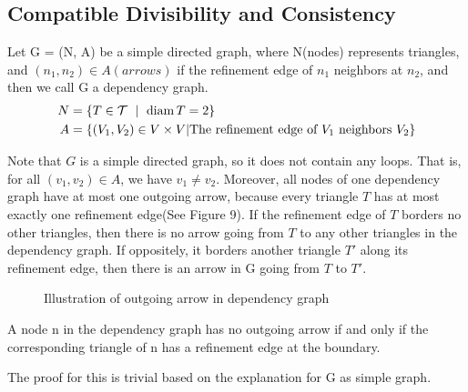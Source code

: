     \subsection{Compatible Divisibility and Consistency}
    \begin{definition*}
      Let G = (N, A) be a simple directed graph, where N(nodes) represents triangles, and $(n_1, n_2)\in A (arrows)$ if the refinement edge of $n_1$ neighbors at $n_2$, and then we call G a dependency graph.
      \begin{align*}
      N &= \{T\in\mathcal{T}~\mid~\operatorname{diam}{T} = 2\}\\
      A &= \{(V_1, V_2)\in V\times V | \text{The refinement edge of $V_1$ neighbors $V_2$}\}
      \end{align*}
    \end{definition*}
    Note that $G$ is a simple directed graph, so it does not contain any loops. That is, for all $(v_1, v_2)\in A$, we have $v_1\neq v_2$. Moreover, all nodes of one dependency graph have at most one outgoing arrow, because every triangle $T$ has at most exactly one refinement edge(See Figure 9). If the refinement edge of $T$ borders no other triangles, then there is no arrow going from $T$ to any other triangles in the dependency graph. If oppositely, it borders another triangle $T'$ along its refinement edge, then there is an arrow in G going from $T$ to $T'$.  %
    \begin{figure}[h!]
    \centering
    \caption{Illustration of outgoing arrow in dependency graph}
    \label{Figure 9}
    \end{figure}

    \begin{lemma*}
    A node n in the dependency graph has no outgoing arrow if and only if the corresponding triangle of n has a refinement edge at the boundary.
    \end{lemma*}
    The proof for this is trivial based on the explanation for G as simple graph.

